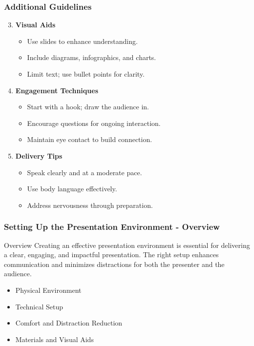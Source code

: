 \documentclass[aspectratio=169]{beamer}
\begin{document}
\begin{frame}[fragile]
    \frametitle{Additional Guidelines}
    \begin{enumerate}
        \setcounter{enumi}{2}  %
        \item \textbf{Visual Aids}
            \begin{itemize}
                \item Use slides to enhance understanding.
                \item Include diagrams, infographics, and charts.
                \item Limit text; use bullet points for clarity.
            \end{itemize}
        \item \textbf{Engagement Techniques}
            \begin{itemize}
                \item Start with a hook; draw the audience in.
                \item Encourage questions for ongoing interaction.
                \item Maintain eye contact to build connection.
            \end{itemize}
        \item \textbf{Delivery Tips}
            \begin{itemize}
                \item Speak clearly and at a moderate pace.
                \item Use body language effectively.
                \item Address nervousness through preparation.
            \end{itemize}
    \end{enumerate}
\end{frame}

\begin{frame}[fragile]
    \frametitle{Setting Up the Presentation Environment - Overview}
    \begin{block}{Overview}
        Creating an effective presentation environment is essential for delivering a clear, engaging, and impactful presentation. The right setup enhances communication and minimizes distractions for both the presenter and the audience.
    \end{block}
    \begin{itemize}
        \item Physical Environment
        \item Technical Setup
        \item Comfort and Distraction Reduction
        \item Materials and Visual Aids
    \end{itemize}
\end{frame}
\end{document}
